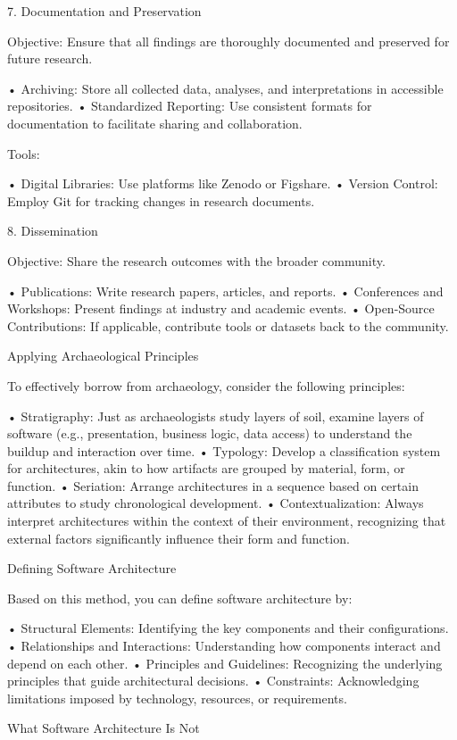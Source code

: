 7. Documentation and Preservation

Objective: Ensure that all findings are thoroughly documented and preserved for future research.

	•	Archiving: Store all collected data, analyses, and interpretations in accessible repositories.
	•	Standardized Reporting: Use consistent formats for documentation to facilitate sharing and collaboration.

Tools:

	•	Digital Libraries: Use platforms like Zenodo or Figshare.
	•	Version Control: Employ Git for tracking changes in research documents.

8. Dissemination

Objective: Share the research outcomes with the broader community.

	•	Publications: Write research papers, articles, and reports.
	•	Conferences and Workshops: Present findings at industry and academic events.
	•	Open-Source Contributions: If applicable, contribute tools or datasets back to the community.

Applying Archaeological Principles

To effectively borrow from archaeology, consider the following principles:

	•	Stratigraphy: Just as archaeologists study layers of soil, examine layers of software (e.g., presentation, business logic, data access) to understand the buildup and interaction over time.
	•	Typology: Develop a classification system for architectures, akin to how artifacts are grouped by material, form, or function.
	•	Seriation: Arrange architectures in a sequence based on certain attributes to study chronological development.
	•	Contextualization: Always interpret architectures within the context of their environment, recognizing that external factors significantly influence their form and function.

Defining Software Architecture

Based on this method, you can define software architecture by:

	•	Structural Elements: Identifying the key components and their configurations.
	•	Relationships and Interactions: Understanding how components interact and depend on each other.
	•	Principles and Guidelines: Recognizing the underlying principles that guide architectural decisions.
	•	Constraints: Acknowledging limitations imposed by technology, resources, or requirements.

What Software Architecture Is Not

